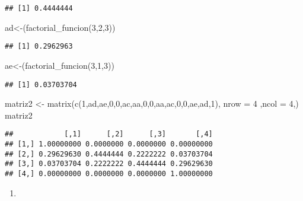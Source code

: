 \documentclass[
]{article}
\newenvironment{Shaded}{\begin{snugshade}}{\end{snugshade}}
\newcommand{\AttributeTok}[1]{\textcolor[rgb]{0.77,0.63,0.00}{#1}}
\newcommand{\DecValTok}[1]{\textcolor[rgb]{0.00,0.00,0.81}{#1}}
\newcommand{\FunctionTok}[1]{\textcolor[rgb]{0.00,0.00,0.00}{#1}}
\newcommand{\NormalTok}[1]{#1}
\newcommand{\OtherTok}[1]{\textcolor[rgb]{0.56,0.35,0.01}{#1}}
\providecommand{\tightlist}{%
  \setlength{\itemsep}{0pt}\setlength{\parskip}{0pt}}
\begin{document}
\begin{verbatim}
## [1] 0.4444444
\end{verbatim}

\begin{Shaded}
\begin{Highlighting}[]
\NormalTok{ad}\OtherTok{\textless{}{-}}\NormalTok{(}\FunctionTok{factorial\_funcion}\NormalTok{(}\DecValTok{3}\NormalTok{,}\DecValTok{2}\NormalTok{,}\DecValTok{3}\NormalTok{))}
\end{Highlighting}
\end{Shaded}

\begin{verbatim}
## [1] 0.2962963
\end{verbatim}

\begin{Shaded}
\begin{Highlighting}[]
\NormalTok{ae}\OtherTok{\textless{}{-}}\NormalTok{(}\FunctionTok{factorial\_funcion}\NormalTok{(}\DecValTok{3}\NormalTok{,}\DecValTok{1}\NormalTok{,}\DecValTok{3}\NormalTok{))}
\end{Highlighting}
\end{Shaded}

\begin{verbatim}
## [1] 0.03703704
\end{verbatim}

\begin{Shaded}
\begin{Highlighting}[]
\NormalTok{matriz2 }\OtherTok{\textless{}{-}} \FunctionTok{matrix}\NormalTok{(}\FunctionTok{c}\NormalTok{(}\DecValTok{1}\NormalTok{,ad,ae,}\DecValTok{0}\NormalTok{,}\DecValTok{0}\NormalTok{,ac,aa,}\DecValTok{0}\NormalTok{,}\DecValTok{0}\NormalTok{,aa,ac,}\DecValTok{0}\NormalTok{,}\DecValTok{0}\NormalTok{,ae,ad,}\DecValTok{1}\NormalTok{),  }\AttributeTok{nrow =} \DecValTok{4}\NormalTok{ ,}\AttributeTok{ncol =} \DecValTok{4}\NormalTok{,)}
\NormalTok{matriz2}
\end{Highlighting}
\end{Shaded}

\begin{verbatim}
##            [,1]      [,2]      [,3]       [,4]
## [1,] 1.00000000 0.0000000 0.0000000 0.00000000
## [2,] 0.29629630 0.4444444 0.2222222 0.03703704
## [3,] 0.03703704 0.2222222 0.4444444 0.29629630
## [4,] 0.00000000 0.0000000 0.0000000 1.00000000
\end{verbatim}

\begin{enumerate}
\def\labelenumi{\alph{enumi})}
\setcounter{enumi}{1}
\tightlist
\item
\end{enumerate}
\end{document}

